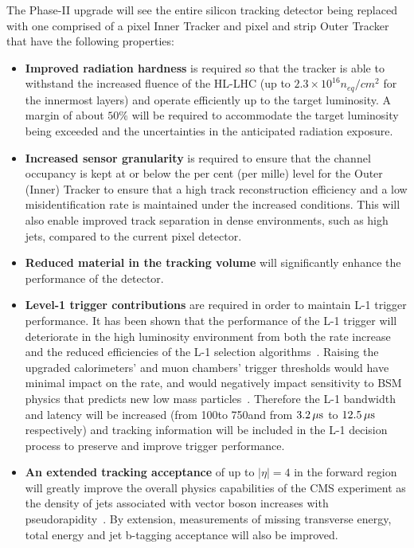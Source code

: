 The Phase-II upgrade will see the entire silicon tracking detector being replaced with one comprised of a pixel Inner Tracker and pixel and strip Outer Tracker that have the following properties:
\begin{itemize}
\item \textbf{Improved radiation hardness} is required so that the tracker is able to withstand the increased fluence of the HL-LHC (up to $2.3\times10^{16} n_{eq}/cm^{2}$ for the innermost layers) and operate efficiently up to the target luminosity. A margin of about $50\%$ will be required to accommodate the target luminosity being exceeded and the uncertainties in the anticipated radiation exposure.
\item \textbf{Increased sensor granularity} is required to ensure that the channel occupancy is kept at or below the per cent (per mille) level for the Outer (Inner) Tracker to ensure that a high track reconstruction efficiency and a low misidentification rate is maintained under the increased \PU conditions. This will also enable improved track separation in dense environments, such as high \pT jets, compared to the current pixel detector.
\item \textbf{Reduced material in the tracking volume} will significantly enhance the performance of the detector.
\item \textbf{Level-1 trigger contributions} are required in order to maintain L-1 trigger performance. It has been shown that the performance of the L-1 trigger will deteriorate in the high luminosity environment from both the rate increase and the reduced efficiencies of the L-1 selection algorithms~\cite{CMS_Upgrade_TP}.
Raising the upgraded calorimeters' and muon chambers' trigger thresholds would have minimal impact on the rate, and would negatively impact sensitivity to BSM physics that predicts new low mass particles~\cite{CMS_Upgrade_TP}.
Therefore the L-1 bandwidth and latency will be increased (from 100\kHz to 750\kHz and from $3.2\,\mu\text{s}$ to $12.5\,\mu\text{s}$ respectively) and tracking information will be included in the L-1 decision process to preserve and improve trigger performance.
\item \textbf{An extended tracking acceptance} of  up to $|\eta| = 4$ in the forward region will greatly improve the overall physics capabilities of the CMS experiment as the density of jets associated with vector boson increases with pseudorapidity~\cite{CMS_Upgrade_TP}. By extension, measurements of missing transverse energy, total energy and jet b-tagging acceptance will also be improved.
\end{itemize}

